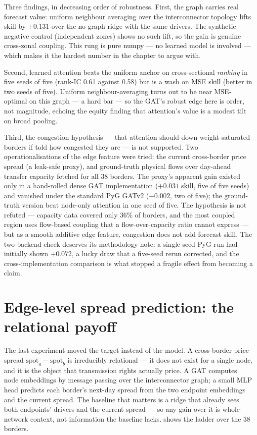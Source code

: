 Three findings, in decreasing order of robustness. First, the graph
carries real forecast value: uniform neighbour averaging over the
interconnector topology lifts skill by $+0.131$ over the no-graph ridge
with the same drivers. The synthetic negative control (independent
zones) shows no such lift, so the gain is genuine cross-zonal coupling.
This rung is pure numpy --- no learned model is involved --- which makes
it the hardest number in the chapter to argue with.

Second, learned attention beats the uniform anchor on cross-sectional
\emph{ranking} in five seeds of five (rank-IC 0.61 against 0.58) but is
a wash on MSE skill (better in two seeds of five). Uniform
neighbour-averaging turns out to be near MSE-optimal on this graph --- a
hard bar --- so the GAT's robust edge here is order, not magnitude,
echoing the equity finding that attention's value is a modest tilt on
broad pooling.

Third, the congestion hypothesis --- that attention should down-weight
saturated borders if told how congested they are --- is not supported.
Two operationalisations of the edge feature were tried: the current
cross-border price spread (a leak-safe proxy), and ground-truth physical
flows over day-ahead transfer capacity fetched for all 38 borders. The
proxy's apparent gain existed only in a hand-rolled dense GAT
implementation ($+0.031$ skill, five of five seeds) and vanished under
the standard PyG GATv2 ($-0.002$, two of five); the ground-truth version
beat node-only attention in one seed of five. The hypothesis is not
refuted --- capacity data covered only 36\% of borders, and the most
coupled region uses flow-based coupling that a flow-over-capacity ratio
cannot express --- but as a smooth additive edge feature, congestion
does not add forecast skill. The two-backend check deserves its
methodology note: a single-seed PyG run had initially shown $+0.072$, a
lucky draw that a five-seed rerun corrected, and the cross-implementation
comparison is what stopped a fragile effect from becoming a claim.

\section{Edge-level spread prediction: the relational payoff}
\label{sec:en-edge}

The last experiment moved the target instead of the model. A
cross-border price spread $\mathrm{spot}_a - \mathrm{spot}_b$ is
irreducibly relational --- it does not exist for a single node, and it is
the object that transmission rights actually price. A GAT computes node
embeddings by message passing over the interconnector graph; a small MLP
head predicts each border's next-day spread from the two endpoint
embeddings and the current spread. The baseline that matters is a ridge
that already sees both endpoints' drivers and the current spread ---
so any gain over it is whole-network context, not information the
baseline lacks.  shows the ladder over the
38 borders.

